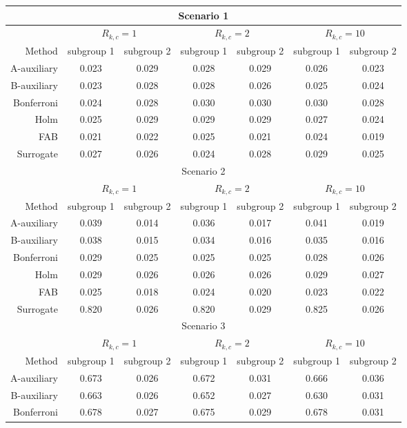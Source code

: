 \begin{tabular}{rcccccc} 
\toprule 
\multicolumn{7}{c}{Scenario 1}\\ 
\midrule 
& \multicolumn{2}{c}{$ R_{k,c}= 1$} & \multicolumn{2}{c}{$R_{k,c} = 2$} & \multicolumn{2}{c}{$R_{k,c} = 10$} \\ 
Method  & subgroup 1 & subgroup 2 & subgroup 1 & subgroup 2 & subgroup 1 & subgroup 2 \\ 
A-auxiliary &0.023 & 0.029 &0.028 & 0.029 &0.026 & 0.023 \\ 
B-auxiliary &0.023 & 0.028 &0.028 & 0.026 &0.025 & 0.024 \\ 
Bonferroni &0.024 & 0.028 &0.030 & 0.030 &0.030 & 0.028 \\ 
Holm &0.025 & 0.029 &0.029 & 0.029 &0.027 & 0.024 \\ 
FAB &0.021 & 0.022 &0.025 & 0.021 &0.024 & 0.019 \\ 
Surrogate &0.027 & 0.026 &0.024 & 0.028 &0.029 & 0.025 \\ 
\bottomrule 
\multicolumn{7}{c}{Scenario 2}\\ 
\midrule 
& \multicolumn{2}{c}{$ R_{k,c} = 1$} & \multicolumn{2}{c}{$ R_{k,c} = 2$} & \multicolumn{2}{c}{$ R_{k,c} = 10$} \\Method  & subgroup 1 & subgroup 2 & subgroup 1 & subgroup 2 & subgroup 1 & subgroup 2 \\ 
A-auxiliary &0.039 & 0.014 &0.036 & 0.017 &0.041 & 0.019 \\ 
B-auxiliary &0.038 & 0.015 &0.034 & 0.016 &0.035 & 0.016 \\ 
Bonferroni &0.029 & 0.025 &0.025 & 0.025 &0.028 & 0.026 \\ 
Holm &0.029 & 0.026 &0.026 & 0.026 &0.029 & 0.027 \\ 
FAB &0.025 & 0.018 &0.024 & 0.020 &0.023 & 0.022 \\ 
Surrogate &0.820 & 0.026 &0.820 & 0.029 &0.825 & 0.026 \\ 
\bottomrule 
\multicolumn{7}{c}{Scenario 3}\\ 
\midrule 
& \multicolumn{2}{c}{$ R_{k,c} = 1$} & \multicolumn{2}{c}{$R_{k,c} = 2$} & \multicolumn{2}{c}{$R_{k,c} = 10$} \\ 
Method  & subgroup 1 & subgroup 2 & subgroup 1 & subgroup 2 & subgroup 1 & subgroup 2 \\ 
A-auxiliary &0.673 & 0.026 &0.672 & 0.031 &0.666 & 0.036 \\ 
 B-auxiliary &0.663 & 0.026 &0.652 & 0.027 &0.630 & 0.031 \\ 
 Bonferroni &0.678 & 0.027 &0.675 & 0.029 &0.678 & 0.031 \\ 

\end{tabular}
